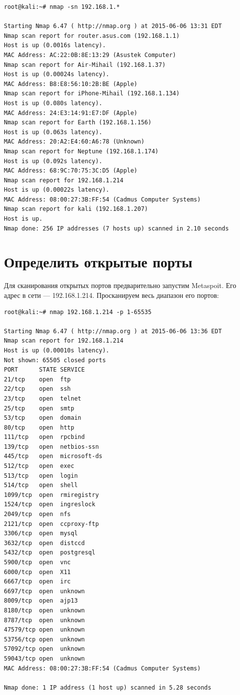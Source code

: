 \documentclass[utf8x, 12pt]{G7-32}
\begin{document}
\begin{lstlisting}
root@kali:~# nmap -sn 192.168.1.*

Starting Nmap 6.47 ( http://nmap.org ) at 2015-06-06 13:31 EDT
Nmap scan report for router.asus.com (192.168.1.1)
Host is up (0.0016s latency).
MAC Address: AC:22:0B:8E:13:29 (Asustek Computer)
Nmap scan report for Air-Mihail (192.168.1.37)
Host is up (0.00024s latency).
MAC Address: B8:E8:56:10:2B:BE (Apple)
Nmap scan report for iPhone-Mihail (192.168.1.134)
Host is up (0.080s latency).
MAC Address: 24:E3:14:91:E7:DF (Apple)
Nmap scan report for Earth (192.168.1.156)
Host is up (0.063s latency).
MAC Address: 20:A2:E4:60:A6:78 (Unknown)
Nmap scan report for Neptune (192.168.1.174)
Host is up (0.092s latency).
MAC Address: 68:9C:70:75:3C:D5 (Apple)
Nmap scan report for 192.168.1.214
Host is up (0.00022s latency).
MAC Address: 08:00:27:3B:FF:54 (Cadmus Computer Systems)
Nmap scan report for kali (192.168.1.207)
Host is up.
Nmap done: 256 IP addresses (7 hosts up) scanned in 2.10 seconds

\end{lstlisting}


\newpage
\section{Определить открытые порты}

Для сканирования открытых портов предварительно запустим Metaspoit. Его адрес в сети --- 192.168.1.214. Просканируем весь диапазон его портов:


\begin{lstlisting}
root@kali:~# nmap 192.168.1.214 -p 1-65535

Starting Nmap 6.47 ( http://nmap.org ) at 2015-06-06 13:36 EDT
Nmap scan report for 192.168.1.214
Host is up (0.00010s latency).
Not shown: 65505 closed ports
PORT      STATE SERVICE
21/tcp    open  ftp
22/tcp    open  ssh
23/tcp    open  telnet
25/tcp    open  smtp
53/tcp    open  domain
80/tcp    open  http
111/tcp   open  rpcbind
139/tcp   open  netbios-ssn
445/tcp   open  microsoft-ds
512/tcp   open  exec
513/tcp   open  login
514/tcp   open  shell
1099/tcp  open  rmiregistry
1524/tcp  open  ingreslock
2049/tcp  open  nfs
2121/tcp  open  ccproxy-ftp
3306/tcp  open  mysql
3632/tcp  open  distccd
5432/tcp  open  postgresql
5900/tcp  open  vnc
6000/tcp  open  X11
6667/tcp  open  irc
6697/tcp  open  unknown
8009/tcp  open  ajp13
8180/tcp  open  unknown
8787/tcp  open  unknown
47579/tcp open  unknown
53756/tcp open  unknown
57092/tcp open  unknown
59043/tcp open  unknown
MAC Address: 08:00:27:3B:FF:54 (Cadmus Computer Systems)

Nmap done: 1 IP address (1 host up) scanned in 5.28 seconds
\end{lstlisting}
\end{document}
